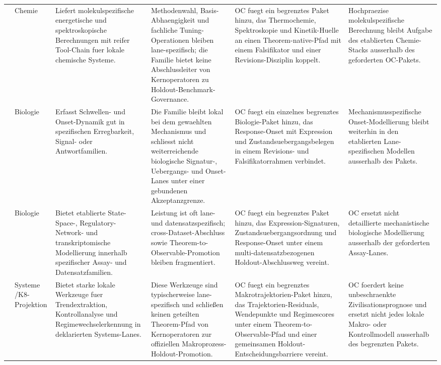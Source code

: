 \begin{longtable}{@{}L{0.17\textwidth}L{0.09\textwidth}L{0.17\textwidth}L{0.17\textwidth}L{0.20\textwidth}L{0.14\textwidth}@{}}
 & Chemie & Liefert molekulspezifische energetische und spektroskopische Berechnungen mit reifer Tool-Chain fuer lokale chemische Systeme. & Methodenwahl, Basis-Abhaengigkeit und fachliche Tuning-Operationen bleiben lane-spezifisch; die Familie bietet keine Abschlussleiter von Kernoperatoren zu Holdout-Benchmark-Governance. & OC fuegt ein begrenztes Paket hinzu, das Thermochemie, Spektroskopie und Kinetik-Huelle an einen Theorem-native-Pfad mit einem Falsifikator und einer Revisions-Disziplin koppelt. & Hochpraezise molekulspezifische Berechnung bleibt Aufgabe des etablierten Chemie-Stacks ausserhalb des geforderten OC-Pakets. \\
 & Biologie & Erfasst Schwellen- und Onset-Dynamik gut in spezifischen Erregbarkeit, Signal- oder Antwortfamilien. & Die Familie bleibt lokal bei dem gewaehlten Mechanismus und schliesst nicht weiterreichende biologische Signatur-, Uebergangs- und Onset-Lanes unter einer gebundenen Akzeptanzgrenze. & OC fuegt ein einzelnes begrenztes Biologie-Paket hinzu, das Response-Onset mit Expression und Zustandsuebergangsbelegen in einem Revisions- und Falsifikatorrahmen verbindet. & Mechanismusspezifische Onset-Modellierung bleibt weiterhin in den etablierten Lane-spezifischen Modellen ausserhalb des Pakets. \\
 & Biologie & Bietet etablierte State-Space-, Regulatory-Network- und transkriptomische Modellierung innerhalb spezifischer Assay- und Datensatzfamilien. & Leistung ist oft lane- und datensatzspezifisch; cross-Dataset-Abschluss sowie Theorem-to-Observable-Promotion bleiben fragmentiert. & OC fuegt ein begrenztes Paket hinzu, das Expression-Signaturen, Zustandsuebergangsordnung und Response-Onset unter einem multi-datensatzbezogenen Holdout-Abschlussweg vereint. & OC ersetzt nicht detaillierte mechanistische biologische Modellierung ausserhalb der geforderten Assay-Lanes. \\
 & Systeme /\allowbreak K8-Projektion & Bietet starke lokale Werkzeuge fuer Trendextraktion, Kontrollanalyse und Regimewechselerkennung in deklarierten Systems-Lanes. & Diese Werkzeuge sind typischerweise lane-spezifisch und schließen keinen geteilten Theorem-Pfad von Kernoperatoren zur offiziellen Makroprozess-Holdout-Promotion. & OC fuegt ein begrenztes Makrotrajektorien-Paket hinzu, das Trajektorien-Residuals, Wendepunkte und Regimescores unter einem Theorem-to-Observable-Pfad und einer gemeinsamen Holdout-Entscheidungsbarriere vereint. & OC foerdert keine unbeschraenkte Zivilisationsprognose und ersetzt nicht jedes lokale Makro- oder Kontrollmodell ausserhalb des begrenzten Pakets. \\

\end{longtable}
